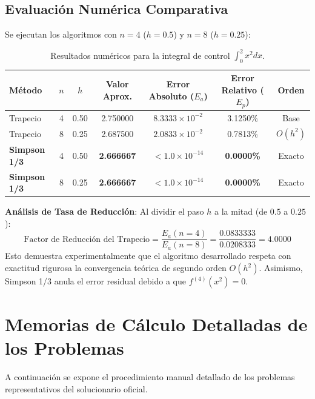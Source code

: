 \documentclass[11pt,a4paper]{article}
\begin{document}
\subsection{Evaluación Numérica Comparativa}
Se ejecutan los algoritmos con $n = 4$ ($h = 0.5$) y $n = 8$ ($h = 0.25$):

\begin{table}[h!]
\centering
\caption{Resultados numéricos para la integral de control $\int_0^2 x^2 dx$.}
\begin{tabular}{lcccccc}
\toprule
\textbf{Método} & $n$ & $h$ & \textbf{Valor Aprox.} & \textbf{Error Absoluto ($E_a$)} & \textbf{Error Relativo ($E_p$)} & \textbf{Orden} \\
\midrule
Trapecio & 4 & 0.50 & 2.750000 & $8.3333 \times 10^{-2}$ & 3.1250\% & Base \\
Trapecio & 8 & 0.25 & 2.687500 & $2.0833 \times 10^{-2}$ & 0.7813\% & $O(h^2)$ \\
\midrule
\textbf{Simpson 1/3} & 4 & 0.50 & \textbf{2.666667} & $< 1.0 \times 10^{-14}$ & \textbf{0.0000\%} & Exacto \\
\textbf{Simpson 1/3} & 8 & 0.25 & \textbf{2.666667} & $< 1.0 \times 10^{-14}$ & \textbf{0.0000\%} & Exacto \\
\bottomrule
\end{tabular}
\end{table}

\begin{notabox}
\textbf{Análisis de Tasa de Reducción}:
Al dividir el paso $h$ a la mitad (de $0.5$ a $0.25$):
$$\text{Factor de Reducción del Trapecio} = \frac{E_a(n=4)}{E_a(n=8)} = \frac{0.0833333}{0.0208333} = 4.0000$$
Esto demuestra experimentalmente que el algoritmo desarrollado respeta con exactitud rigurosa la convergencia teórica de segundo orden $O(h^2)$. Asimismo, Simpson 1/3 anula el error residual debido a que $f^{(4)}(x^2) = 0$.
\end{notabox}

\section{Memorias de Cálculo Detalladas de los Problemas}

A continuación se expone el procedimiento manual detallado de los problemas representativos del solucionario oficial.
\end{document}

